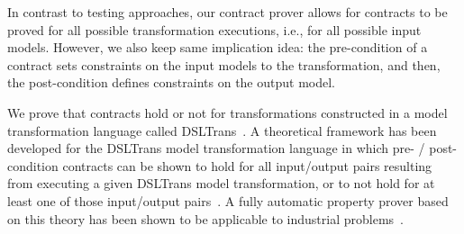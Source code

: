 In contrast to testing approaches, our contract prover allows for contracts to be proved for all possible transformation executions, i.e., for all possible input models. However, we also keep same implication idea: the pre-condition of a contract sets constraints on the input models to the transformation, and then, the post-condition defines constraints on the output model.


We prove that contracts hold or not for transformations constructed in a model transformation language called DSLTrans~\cite{Barroca2011}.  A theoretical framework has been developed for the DSLTrans model transformation language in which pre- / post- condition contracts can be shown to hold for all input/output pairs resulting from executing a given DSLTrans model transformation, or to not hold for at least one of those input/output pairs~\cite{Lucio2014}. A fully automatic property prover based on this theory has been shown to be applicable to industrial problems~\cite{Selim2014}.


